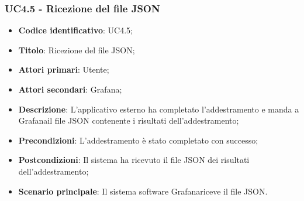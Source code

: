 \subsubsection{UC4.5 - Ricezione del file JSON}
\begin{itemize}
    \item \textbf{Codice identificativo}: UC4.5;
    \item \textbf{Titolo}: Ricezione del file JSON;
    \item \textbf{Attori primari}: Utente;
    \item \textbf{Attori secondari}: Grafana\glo ;
    \item \textbf{Descrizione}: L'applicativo esterno ha completato l'addestramento e manda a Grafana\glosp il file JSON contenente i risultati dell'addestramento;
    \item \textbf{Precondizioni}: L'addestramento è stato completato con successo;
    \item \textbf{Postcondizioni}: Il sistema ha ricevuto il file JSON dei risultati dell'addestramento;
    \item \textbf{Scenario principale}: Il sistema software Grafana\glo riceve il file JSON.
\end{itemize}